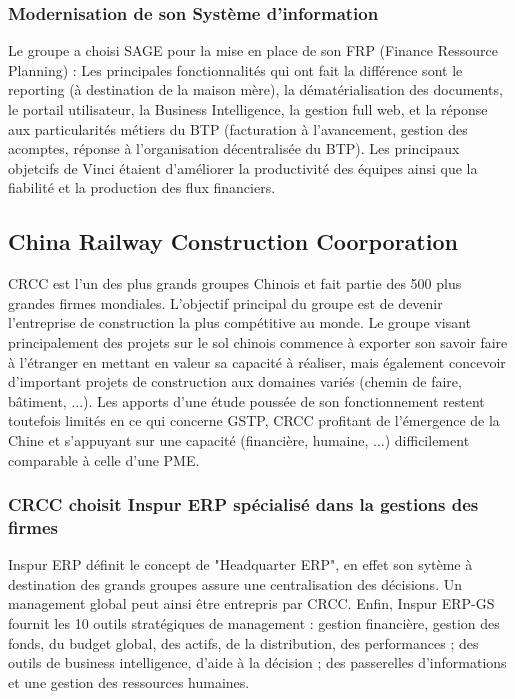 \subsubsection{Modernisation de son Système d'information}
Le groupe a choisi SAGE pour la mise en place de son FRP (Finance Ressource Planning) :
Les principales fonctionnalités qui ont fait la différence sont le reporting (à destination de la maison mère), la dématérialisation des documents, le portail utilisateur, la Business Intelligence, la gestion full web, et la réponse aux particularités métiers du BTP (facturation à l'avancement, gestion des acomptes, réponse à l'organisation décentralisée du BTP).
Les principaux objetcifs de Vinci étaient d'améliorer la productivité des équipes ainsi que la fiabilité et la production des flux financiers.

\subsection{China Railway Construction Coorporation}
CRCC est l'un des plus grands groupes Chinois et fait partie des 500 plus grandes firmes mondiales. L'objectif principal du groupe est de devenir l'entreprise de construction la plus compétitive au monde.
Le groupe visant principalement des projets sur le sol chinois commence à exporter son savoir faire à l'étranger en mettant en valeur
sa capacité à réaliser, mais également concevoir d'important projets de construction aux domaines variés (chemin de faire, bâtiment, ...).
Les apports d'une étude poussée de son fonctionnement restent toutefois limités en ce qui concerne GSTP, 
CRCC profitant de l'émergence de la Chine et s'appuyant sur une capacité (financière, humaine, ...) difficilement comparable à celle d'une PME.


\subsubsection{CRCC choisit Inspur ERP spécialisé dans la gestions des firmes}
Inspur ERP définit le concept de "Headquarter ERP", en effet son sytème à destination des grands groupes assure une centralisation des décisions.
Un management global peut ainsi être entrepris par CRCC. 
Enfin, Inspur ERP-GS fournit les 10 outils stratégiques de management : gestion financière, gestion des fonds, du budget global, des actifs, de la distribution, des performances ; des outils de business intelligence, d'aide à la décision ; des passerelles d'informations et une gestion des ressources humaines.


